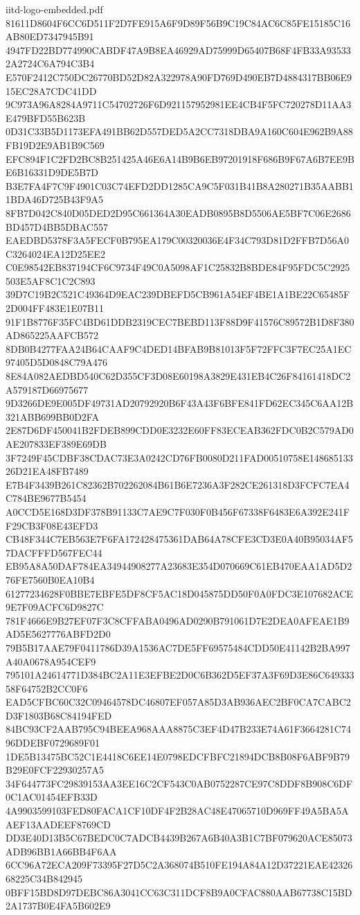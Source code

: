 \begin{filecontents*}[overwrite]{iitd-logo-embedded.pdf}
81611D8604F6CC6D511F2D7FE915A6F9D89F56B9C19C84AC6C85FE15185C16AB80ED7347945B91
4947FD22BD774990CABDF47A9B8EA46929AD75999D65407B68F4FB33A935332A2724C6A794C3B4
E570F2412C750DC26770BD52D82A322978A90FD769D490EB7D4884317BB06E915EC28A7CDC41DD
9C973A96A8284A9711C54702726F6D921157952981EE4CB4F5FC720278D11AA3E479BFD55B623B
0D31C33B5D1173EFA491BB62D557DED5A2CC7318DBA9A160C604E962B9A88FB19D2E9AB1B9C569
EFC894F1C2FD2BC8B251425A46E6A14B9B6EB97201918F686B9F67A6B7EE9BE6B16331D9DE5B7D
B3E7FA4F7C9F4901C03C74EFD2DD1285CA9C5F031B41B8A280271B35AABB11BDA46D725B43F9A5
8FB7D042C840D05DED2D95C661364A30EADB0895B8D5506AE5BF7C06E2686BD457D4BB5DBAC557
EAEDBD5378F3A5FECF0B795EA179C00320036E4F34C793D81D2FFB7D56A0C3264024EA12D25EE2
C0E98542EB837194CF6C9734F49C0A5098AF1C25832B8BDE84F95FDC5C2925503E5AF8C1C2C893
39D7C19B2C521C49364D9EAC239DBEFD5CB961A54EF4BE1A1BE22C65485F2D004FF483E1E07B11
91F1B8776F35FC4BD61DDB2319CEC7BEBD113F88D9F41576C89572B1D8F380AD865225AAFCB572
8DB0B4277FAA24B64CAAF9C4DED14BFAB9B81013F5F72FFC3F7EC25A1EC97405D5D0848C79A476
8E84A082AEDBD540C62D355CF3D08E60198A3829E431EB4C26F84161418DC2A579187D66975677
9D3266DE9E005DF49731AD20792920B6F43A43F6BFE841FD62EC345C6AA12B321ABB699BB0D2FA
2E87D6DF450041B2FDEB899CDD0E3232E60FF83ECEAB362FDC0B2C579AD0AE207833EF389E69DB
3F7249F45CDBF38CDAC73E3A0242CD76FB0080D211FAD00510758E14868513326D21EA48FB7489
E7B4F3439B261C82362B702262084B61B6E7236A3F282CE261318D3FCFC7EA4C784BE9677B5454
A0CCD5E168D3DF378B91133C7AE9C7F030F0B456F67338F6483E6A392E241FF29CB3F08E43EFD3
CB48F344C7EB563E7F6FA172428475361DAB64A78CFE3CD3E0A40B95034AF57DACFFFD567FEC44
EB95A8A50DAF784EA34944908277A23683E354D070669C61EB470EAA1AD5D276FE7560B0EA10B4
61277234628F0BBE7EBFE5DF8CF5AC18D045875DD50F0A0FDC3E107682ACE9E7F09ACFC6D9827C
781F4666E9B27EF07F3C8CFFABA0496AD0290B791061D7E2DEA0AFEAE1B9AD5E5627776ABFD2D0
79B5B17AAE79F0411786D39A1536AC7DE5FF69575484CDD50E41142B2BA997A40A0678A954CEF9
795101A24614771D384BC2A11E3EFBE2D0C6B362D5EF37A3F69D3E86C64933358F64752B2CC0F6
EAD5CFBC60C32C09464578DC46807EF057A85D3AB936AEC2BF0CA7CABC2D3F1803B68C84194FED
84BC93CF2AAB795C94BEEA968AAA8875C3EF4D47B233E74A61F3664281C7496DDEBF0729689F01
1DE5B13475BC52C1E4418C6EE14E0798EDCFBFC21894DCB8B08F6ABF9B79B29E0FCF22930257A5
34F644773FC29839153AA3EE16C2CF543C0AB0752287CE97C8DDF8B908C6DF0C1AC01454EFB33D
4A9903599103FED80FACA1CF10DF4F2B28AC48E47065710D969FF49A5BA5AAEF13AADEEF8769CD
DD3E40D13B5C67BEDC0C7ADCB4439B267A6B40A3B1C7BF079620ACE85073ADB96BB1A66BB4F6AA
6CC96A72ECA209F73395F27D5C2A368074B510FE194A84A12D37221EAE4232668225C34B842945
0BFF15BD8D97DEBC86A3041CC63C311DCF8B9A0CFAC880AAB67738C15BD2A1737B0E4FA5B602E9

\end{filecontents*}
